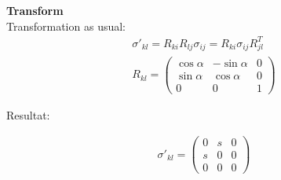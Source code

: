 \documentclass[a4paper]{scrartcl}
\begin{document}
\textbf{Transform}\\
Transformation as usual:
\begin{align}
\sigma'_{kl}=R_{ki}R_{lj}\sigma_{ij}=R_{ki}\sigma_{ij}R_{jl}^T \\
R_{kl}=\begin{pmatrix} 
\cos \alpha & -\sin \alpha & 0 \\
\sin \alpha &  \cos \alpha & 0 \\            
   0        &  0           & 1
\end{pmatrix}
\end{align}

Resultat:

\begin{align}
\sigma'_{kl}=\begin{pmatrix}
0 & s & 0 \\
s & 0 & 0 \\
0 & 0 & 0
\end{pmatrix}
\end{align}
\end{document}

